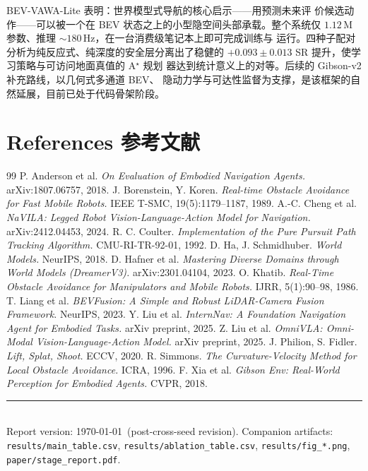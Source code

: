 \documentclass[11pt,a4paper]{article}
\newcommand{\zh}[1]{\par\noindent\color{zhcol}\hspace{0.5em}#1\par\color{black}\vspace{0.6em}}
\begin{document}
\zh{\textsf{BEV-VAWA-Lite 表明：世界模型式导航的核心启示——用预测未来评
价候选动作——可以被一个在 BEV 状态之上的小型隐空间头部承载。整个系统仅
$1.12\,$M 参数、推理 $\sim 180\,$Hz，在一台消费级笔记本上即可完成训练与
运行。四种子配对分析为纯反应式、纯深度的安全层分离出了稳健的
$+0.093 \pm 0.013$ SR 提升，使学习策略与可访问地面真值的 A$^\star$ 规划
器达到统计意义上的对等。后续的 Gibson-v2 补充路线，以几何式多通道 BEV、
隐动力学与可达性监督为支撑，是该框架的自然延展，目前已处于代码骨架阶段。}}

\section*{References \quad\normalfont\small\color{zhcol}\textsf{参考文献}}
\begin{small}
\begin{thebibliography}{99}
 P. Anderson et al. \emph{On Evaluation of
      Embodied Navigation Agents.} arXiv:1807.06757, 2018.
 J. Borenstein, Y. Koren. \emph{Real-time
      Obstacle Avoidance for Fast Mobile Robots.} IEEE T-SMC, 19(5):1179--1187, 1989.
 A.-C. Cheng et al. \emph{NaVILA: Legged Robot
      Vision-Language-Action Model for Navigation.} arXiv:2412.04453, 2024.
 R. C. Coulter. \emph{Implementation of the Pure
      Pursuit Path Tracking Algorithm.} CMU-RI-TR-92-01, 1992.
 D. Ha, J. Schmidhuber. \emph{World Models.}
      NeurIPS, 2018.
 D. Hafner et al. \emph{Mastering Diverse Domains
      through World Models (DreamerV3).} arXiv:2301.04104, 2023.
 O. Khatib. \emph{Real-Time Obstacle Avoidance for
      Manipulators and Mobile Robots.} IJRR, 5(1):90--98, 1986.
 T. Liang et al. \emph{BEVFusion: A Simple and Robust
      LiDAR-Camera Fusion Framework.} NeurIPS, 2023.
 Y. Liu et al. \emph{InternNav: A Foundation Navigation
      Agent for Embodied Tasks.} arXiv preprint, 2025.
 Z. Liu et al. \emph{OmniVLA: Omni-Modal
      Vision-Language-Action Model.} arXiv preprint, 2025.
 J. Philion, S. Fidler. \emph{Lift, Splat, Shoot.} ECCV, 2020.
 R. Simmons. \emph{The Curvature-Velocity Method for
      Local Obstacle Avoidance.} ICRA, 1996.
 F. Xia et al. \emph{Gibson Env: Real-World Perception for
      Embodied Agents.} CVPR, 2018.
\end{thebibliography}
\end{small}

\vspace{1em}
\noindent\color{rulecol}\rule{\textwidth}{0.3pt}\color{black}\\
\small \textsf{Report version: \today\ (post-cross-seed revision). Companion
artifacts: \texttt{results/main\_table.csv}, \texttt{results/ablation\_table.csv},
\texttt{results/fig\_*.png}, \texttt{paper/stage\_report.pdf}.}
\end{document}
